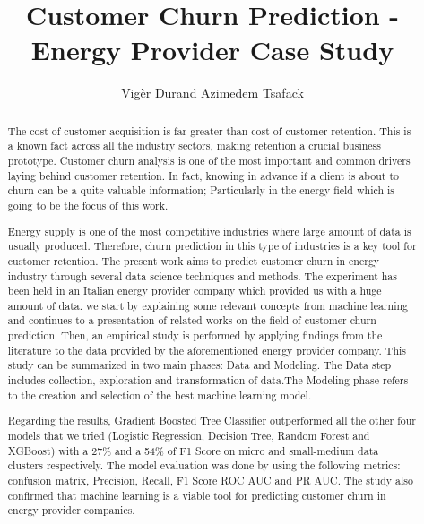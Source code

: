 \documentclass[LaM,binding=0.6cm, english]{sapthesis}
\title{Customer Churn Prediction - Energy Provider Case Study}
\author{Vigèr Durand Azimedem Tsafack}
\begin{document}
\frontmatter

\maketitle

\begin{abstract}

\par The cost of customer acquisition is far greater than cost of customer
retention. This is a known fact across all the industry sectors, making retention a crucial business prototype. Customer churn analysis is one of the most important and common drivers laying behind customer retention. In fact, knowing in advance if a client is about to churn can be a quite valuable information; Particularly in the energy field which is going to be the focus of this work.

\par Energy supply is one of the most competitive industries where large amount of data is usually produced. Therefore, churn prediction in this type of industries is a key tool for customer retention. The present work aims to predict customer churn in energy industry through several data science techniques and methods. The experiment has been held in an Italian energy provider company which provided us with a huge amount of data. we start by explaining some relevant concepts from machine learning and continues to a presentation of related works on the field of customer churn prediction. Then, an empirical study is performed by applying findings from the literature to the data provided by the aforementioned energy provider company. This study can be summarized in two main phases: Data and Modeling. The Data step includes collection, exploration and transformation of data.The Modeling phase refers to the creation and selection of the best machine learning model.

\par Regarding the results, Gradient Boosted Tree Classifier outperformed all the other four models that we tried (Logistic Regression, Decision Tree, Random Forest and XGBoost) with a 27\% and a 54\% of F1 Score on micro and small-medium data clusters respectively. The model evaluation was done by using the following metrics: confusion matrix, Precision, Recall, F1 Score ROC AUC and PR AUC. The study also confirmed that machine learning is a viable tool for predicting customer churn in energy provider companies.

\end{abstract}
\end{document}
